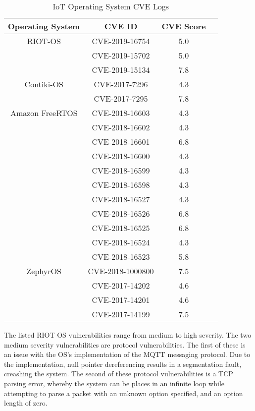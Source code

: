 \begin{table}[H]
	\centering
	\caption{IoT Operating System CVE Logs}
	\label{tab:iotCve}
	\begin{tabular}{|c|c|c|c|}
	\hline
	Operating System & CVE ID & CVE Score \\
	\hline\hline
	RIOT-OS & CVE-2019-16754 & 5.0 \\
		& CVE-2019-15702 & 5.0 \\
		& CVE-2019-15134 & 7.8 \\
	\hline
	Contiki-OS & CVE-2017-7296 & 4.3 \\
		   & CVE-2017-7295 & 7.8 \\
	\hline
	Amazon FreeRTOS & CVE-2018-16603 & 4.3 \\
			& CVE-2018-16602 & 4.3 \\
			& CVE-2018-16601 & 6.8 \\
			& CVE-2018-16600 & 4.3 \\
			& CVE-2018-16599 & 4.3 \\
			& CVE-2018-16598 & 4.3 \\
			& CVE-2018-16527 & 4.3 \\
			& CVE-2018-16526 & 6.8 \\
			& CVE-2018-16525 & 6.8 \\
			& CVE-2018-16524 & 4.3 \\
			& CVE-2018-16523 & 5.8 \\
	\hline
	ZephyrOS & CVE-2018-1000800 & 7.5 \\
		 & CVE-2017-14202   & 4.6 \\
		 & CVE-2017-14201   & 4.6 \\
		 & CVE-2017-14199   & 7.5 \\
	\hline\hline
	\end{tabular}
\end{table}


The listed RIOT OS vulnerabilities range from medium to high severity. The two
medium severity vulnerabilities are protocol vulnerabilities. The first of these
is an issue with the OS's implementation of the MQTT messaging
protocol\cite{riotCve1}. Due to
the implementation, null pointer dereferencing results in a segmentation fault,
creashing the system\cite{riotMqtt}. The second of these protocol vulnerabilities
is a TCP parsing error\cite{riotCve2}, whereby the system can be places in an infinite loop while
attempting to parse a packet with an  unknown option specified, and an option
length of zero\cite{riotTcp}.


